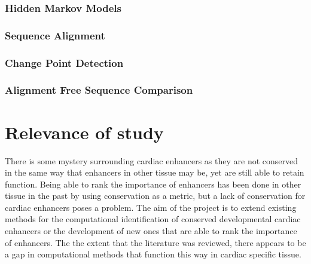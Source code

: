 \documentclass[12pt,a4paper]{article}
\begin{document}
            \subsubsection{Hidden Markov Models}
             
            
            \subsubsection{Sequence Alignment}
            
            
            \subsubsection{Change Point Detection}
            
            
            
            \subsubsection{Alignment Free Sequence Comparison}
            
            
            
            
            
        
    \section{Relevance of study}
        There is some mystery surrounding cardiac enhancers as they are not conserved in the same way that enhancers in other tissue may be, yet are still able to retain function. Being able to rank the importance of enhancers has been done in other tissue in the past by using conservation as a metric, but a lack of conservation for cardiac enhancers poses a problem.
        The aim of the project is to extend existing methods for the computational identification of conserved developmental cardiac enhancers or the development of new ones that are able to rank the importance of enhancers. The the extent that the literature was reviewed, there appears to be a gap in computational methods that function this way in cardiac specific tissue.
        
\end{document}
